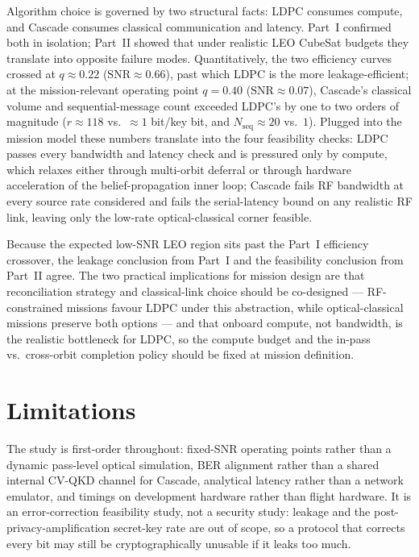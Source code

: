 \documentclass{UoYCSproject}
\begin{document}
Algorithm choice is governed by two structural facts: LDPC consumes
compute, and Cascade consumes classical communication and latency. Part~I
confirmed both in isolation; Part~II showed that under realistic LEO CubeSat
budgets they translate into opposite failure modes. Quantitatively, the two
efficiency curves crossed at $q \approx 0.22$
($\mathrm{SNR}\!\approx\!0.66$), past which LDPC is the more
leakage-efficient; at the mission-relevant operating point
$q = 0.40$ ($\mathrm{SNR}\!\approx\!0.07$), Cascade's classical volume
and sequential-message count exceeded LDPC's by one to two orders of
magnitude ($r \approx 118$ vs.\ $\approx 1$ bit/key bit, and
$N_{\text{seq}} \approx 20$ vs.\ $1$). Plugged into the mission model
these numbers translate into the four feasibility checks: LDPC passes
every bandwidth and latency check and is pressured only by compute,
which relaxes either through multi-orbit deferral or through
hardware acceleration of the belief-propagation inner loop; Cascade
fails RF bandwidth at every source rate considered and fails the
serial-latency bound on any realistic RF link, leaving only the
low-rate optical-classical corner feasible.

Because the expected low-SNR LEO region sits past the Part~I efficiency
crossover, the leakage conclusion from Part~I and the feasibility
conclusion from Part~II agree. The two practical implications for
mission design are that reconciliation strategy and classical-link
choice should be co-designed --- RF-constrained missions favour LDPC under this abstraction,
while optical-classical missions preserve both options --- and that onboard
compute, not bandwidth, is the realistic bottleneck for LDPC, so the
compute budget and the in-pass vs.\ cross-orbit completion policy
should be fixed at mission definition.

\section{Limitations}
\label{sec:limitations}

The study is first-order throughout: fixed-SNR operating points rather than
a dynamic pass-level optical simulation, BER alignment rather than a shared
internal CV-QKD channel for Cascade, analytical latency rather than a
network emulator, and timings on development hardware rather than flight
hardware. It is an error-correction feasibility study, not a security
study: leakage and the post-privacy-amplification secret-key rate are out
of scope, so a protocol that corrects every bit may still be
cryptographically unusable if it leaks too much.
\end{document}
